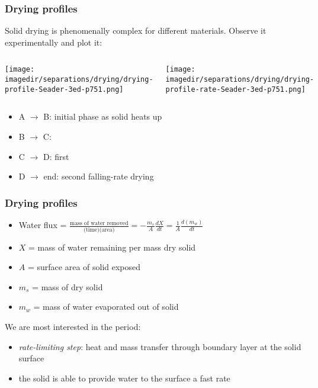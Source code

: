 \begin{frame}\frametitle{Drying profiles}
	Solid drying is phenomenally complex for different materials. Observe it experimentally and plot it:

	\hfill{}
	\vspace{-12pt}
	\begin{columns}[b]
			\begin{center}
				\texttt{[image: \\imagedir/separations/drying/drying-profile-Seader-3ed-p751.png]}
			\end{center}
			\begin{center}
				\texttt{[image: \\imagedir/separations/drying/drying-profile-rate-Seader-3ed-p751.png]}
			\end{center}
			\vspace{-7pt}
	\end{columns}

	\begin{itemize}
		\item	A $\rightarrow$ B: initial phase as solid heats up
		\item	B $\rightarrow$ C: {\color{purple}{constant-rate drying}}
		\item	C $\rightarrow$ D: first {\color{purple}{falling-rate drying}}
		\item	D $\rightarrow$ end: second falling-rate drying
	\end{itemize}
\end{frame}

\begin{frame}\frametitle{Drying profiles}
	\begin{itemize}
		\item	Water flux = $\displaystyle \frac{\text{mass of water removed}}{\text{(time)(area)}} = - \displaystyle \frac{m_s}{A} \frac{dX}{dt} = \frac{1}{A} \frac{d(m_w)}{dt}$
		\item	$X$ = mass of water remaining per mass dry solid
		\item	$A$ = surface area of solid exposed
		\item	$m_s$ = mass of dry solid
		\item	$m_w$ = mass of water evaporated out of solid
	\end{itemize}
	\vspace{12pt}
	We are most interested in the {\color{purple}{constant drying-rate}} period:
	\begin{itemize}
		\item	\emph{rate-limiting step}: heat and mass transfer through boundary layer at the solid surface
		\item	the solid is able to provide water to the surface a fast rate
	\end{itemize}
\end{frame}

